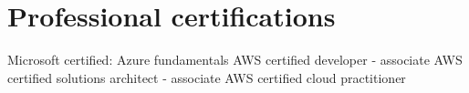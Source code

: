 \section{Professional certifications}
{%
}
{%
	Microsoft certified: Azure fundamentals}
{}
{%
}
{%
	AWS certified developer - associate}
{}
{%
}
{%
	AWS certified solutions architect - associate}
{}
{%
}
{%
	AWS certified cloud practitioner}
{}

